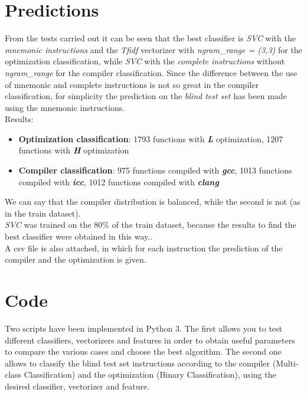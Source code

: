 \documentclass[11pt]{article}
\begin{document}
\section{Predictions}
From the tests carried out it can be seen that the best classifier is \textit{SVC} with the \textit{mnemonic instructions} and the \textit{Tfidf} vectorizer with \textit{ngram\_range = (3,3)}  for the optimization classification, while \textit{SVC} with the \textit{complete instructions} without \textit{ngram\_range} for the compiler classification. Since the difference between the use of mnemonic and complete instructions is not so great in the compiler classification, for simplicity the prediction on the \textit{blind test set} has been made using the mnemonic instructions. \\
Results:
\begin{itemize}
	\item \textbf{Optimization classification}: 1793 functions with \textbf{\textit{L}} optimization, 1207 functions with \textbf{\textit{H}} optimization
	\item \textbf{Compiler classification}: 975 functions compiled with \textbf{\textit{gcc}}, 1013 functions compiled with \textbf{\textit{icc}}, 1012 functions compiled with \textbf{\textit{clang}}
\end{itemize}
We can say that the compiler distribution is balanced, while the second is not (as in the train dataset). \\
\textit{SVC} was trained on the 80\% of the train dataset, because the results to find the best classifier were obtained in this way.. \\
A csv file is also attached, in which for each instruction the prediction of the compiler and the optimization is given.

\section{Code}
Two scripts have been implemented in Python 3. The first allows you to test different classifiers, vectorizers and features in order to obtain useful parameters to compare the various cases and choose the best algorithm. The second one allows to classify the blind test set instructions according to the compiler (Multi-class Classification) and the optimization (Binary Classification), using the desired classifier, vectorizer and feature.
\end{document}
